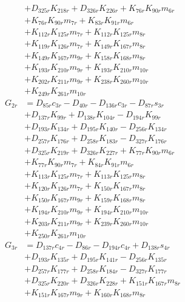 \begin{multicols}{2}
\begin{align}
&+ D_{325r}K_{218r} + D_{326r}K_{226r} + K_{76r}K_{90r}m_{6r}  \nonumber \\
&+ K_{76r}K_{90r}m_{7r} + K_{83r}K_{91r}m_{6r}  \nonumber \\
&+ K_{112r}K_{125r}m_{7r} + K_{112r}K_{125r}m_{8r}  \nonumber \\
&+ K_{119r}K_{126r}m_{7r} + K_{149r}K_{167r}m_{8r}  \nonumber \\
&+ K_{149r}K_{167r}m_{9r} + K_{158r}K_{168r}m_{8r}  \nonumber \\
&+ K_{193r}K_{210r}m_{9r} + K_{193r}K_{210r}m_{10r}  \nonumber \\
&+ K_{202r}K_{211r}m_{9r} + K_{238r}K_{260r}m_{10r}  \nonumber \\
&+ K_{249r}K_{261r}m_{10r} \nonumber \\
G_{2r} &= D_{85r}c_{3r} - D_{40r} - D_{136r}c_{3r} - D_{87r}s_{3r}  \nonumber \\
&+ D_{137r}K_{99r} + D_{138r}K_{104r} - D_{194r}K_{99r}  \nonumber \\
&+ D_{193r}K_{134r} + D_{195r}K_{140r} - D_{256r}K_{134r}  \nonumber \\
&+ D_{257r}K_{176r} + D_{258r}K_{183r} - D_{327r}K_{176r}  \nonumber \\
&+ D_{325r}K_{219r} + D_{326r}K_{227r} + K_{77r}K_{90r}m_{6r}  \nonumber \\
&+ K_{77r}K_{90r}m_{7r} + K_{84r}K_{91r}m_{6r}  \nonumber \\
&+ K_{113r}K_{125r}m_{7r} + K_{113r}K_{125r}m_{8r}  \nonumber \\
&+ K_{120r}K_{126r}m_{7r} + K_{150r}K_{167r}m_{8r}  \nonumber \\
&+ K_{150r}K_{167r}m_{9r} + K_{159r}K_{168r}m_{8r}  \nonumber \\
&+ K_{194r}K_{210r}m_{9r} + K_{194r}K_{210r}m_{10r}  \nonumber \\
&+ K_{203r}K_{211r}m_{9r} + K_{239r}K_{260r}m_{10r}  \nonumber \\
&+ K_{250r}K_{261r}m_{10r} \nonumber \\
G_{3r} &= D_{137r}c_{4r} - D_{86r} - D_{194r}c_{4r} + D_{138r}s_{4r}  \nonumber \\
&+ D_{193r}K_{135r} + D_{195r}K_{141r} - D_{256r}K_{135r}  \nonumber \\
&+ D_{257r}K_{177r} + D_{258r}K_{184r} - D_{327r}K_{177r}  \nonumber \\
&+ D_{325r}K_{220r} + D_{326r}K_{228r} + K_{151r}K_{167r}m_{8r}  \nonumber \\
&+ K_{151r}K_{167r}m_{9r} + K_{160r}K_{168r}m_{8r}  \nonumber \\

\end{align}
\end{multicols}
